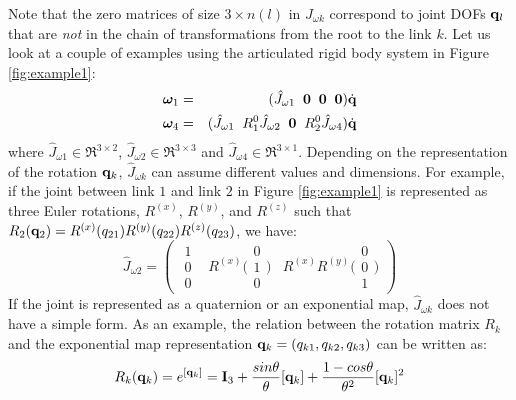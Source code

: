 Note that the zero matrices  of size $3\times n(l)$ in $J_{\omega k}$ correspond to
joint DOFs $\mathbf{q}_l$ that are \emph{not} in the chain of transformations from the root to the
link $k$. 
Let us look at a couple of examples using the articulated
rigid body system in Figure \ref{fig:example1}:
\begin{eqnarray}
\bm{\omega}_1 &=& (\hat{J}_{\omega 1} \;\; \mathbf{0}
\;\;\mathbf{0}\;\;\mathbf{0}) \dot{\mathbf{q}}  \nonumber \\
\bm{\omega}_4 &=& (\hat{J}_{\omega 1} \;\; R^0_1\hat{J}_{\omega 2} \;\;
\mathbf{0} \;\;
R^0_2 \hat{J}_{\omega 4}) \dot{\mathbf{q}} \nonumber
\end{eqnarray}
where $\hat{J}_{\omega 1} \in \Re^{3\times2}$, $\hat{J}_{\omega 2} \in \Re^{3\times3}$ and $\hat{J}_{\omega 4} \in \Re^{3\times1}$.
Depending on the representation of the rotation $\mathbf{q}_k$,
$\hat{J}_{\omega k}$ can assume different values and dimensions. For example, if the joint
between link $1$ and link $2$ in Figure \ref{fig:example1} is
represented as three Euler rotations, $R^{(x)}$, $R^{(y)}$, and
$R^{(z)}$ such that $R_2(\mathbf{q}_2)= R^{(x)}(q_{21}) R^{(y)}(q_{22}) R^{(z)}(q_{23})$, we have:
\begin{equation}
\hat{J}_{\omega 2} = 
\begin{pmatrix}
\begin{array}{c}
1\\
0\\
0
\end{array}
&
R^{(x)} \Bigg (
\begin{array}{c}
0\\
1\\
0
\end{array} 
\Bigg )
&
R^{(x)} R^{(y)}\Bigg (
\begin{array}{c}
0\\
0\\
1
\end{array} 
\Bigg )
\end{pmatrix}
\end{equation}
If the joint is represented as a quaternion or an
exponential map, $\hat{J}_{\omega k}$ does not have a simple form. As an example, the relation between the rotation matrix $R_k$ and the exponential map representation $\mathbf{q}_k=(q_{k1},q_{k2},q_{k3})$ can be written as:
\begin{equation}
R_k(\mathbf{q}_k) = e^{[\mathbf{q}_k]} = \mathbf{I}_3 + \frac{sin \theta}{\theta} [{\mathbf{q}}_k] + \frac{1-cos \theta}{\theta^2}[{\mathbf{q}}_k]^2
\end{equation}
